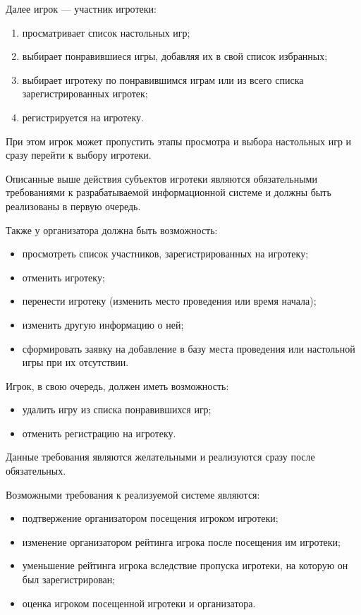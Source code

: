 Далее игрок --- участник игротеки:
\begin{enumerate}[label=\arabic*)]
    \item просматривает список настольных игр;
    \item выбирает понравившиеся игры, добавляя их в свой список избранных;
    \item выбирает игротеку по понравившимся играм или из всего списка
        зарегистрированных игротек;
    \item регистрируется на игротеку.
\end{enumerate}

При этом игрок может пропустить этапы просмотра и выбора настольных игр и
сразу перейти к выбору игротеки.

Описанные выше действия субъектов игротеки являются обязательными требованиями
к разрабатываемой информационной системе и должны быть реализованы в первую
очередь.

Также у организатора должна быть возможность:
\begin{itemize}
    \item просмотреть список участников, зарегистрированных на игротеку;
    \item отменить игротеку;
    \item перенести игротеку (изменить место проведения или время начала);
    \item изменить другую информацию о ней;
    \item сформировать заявку на добавление в базу места проведения или
        настольной игры при их отсутствии.
\end{itemize}

Игрок, в свою очередь, должен иметь возможность:
\begin{itemize}
    \item удалить игру из списка понравившихся игр;
    \item отменить регистрацию на игротеку.
\end{itemize}

Данные требования являются желательными и реализуются сразу после обязательных.
 
Возможными требования к реализуемой системе являются:
\begin{itemize}
    \item подтвержение организатором посещения игроком игротеки;
    \item изменение организатором рейтинга игрока после посещения им игротеки;
    \item уменьшение рейтинга игрока вследствие пропуска игротеки, на которую он
        был зарегистрирован;
    \item оценка игроком посещенной игротеки и организатора.
\end{itemize}

